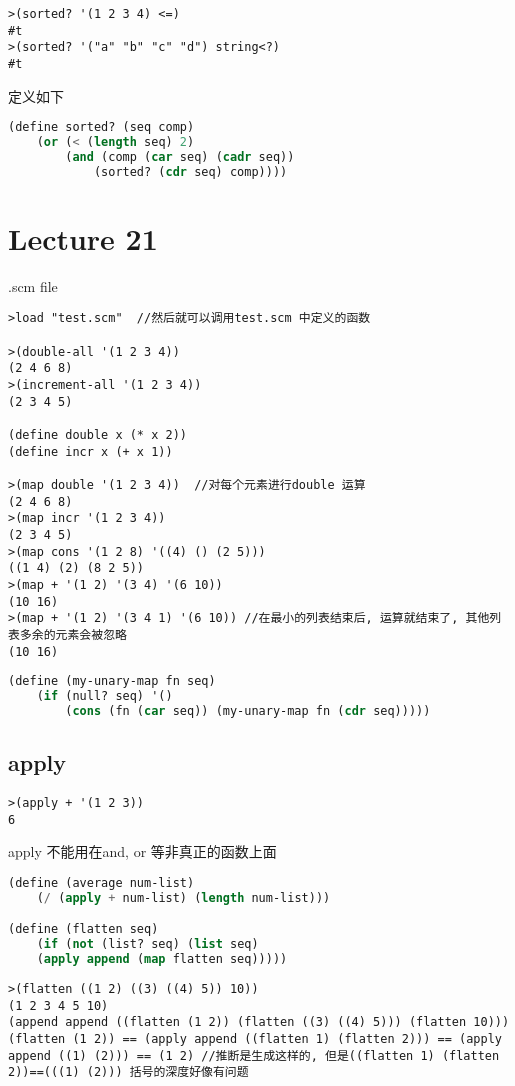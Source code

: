 \documentclass{article}
\begin{document}
\begin{verbatim}
>(sorted? '(1 2 3 4) <=)
#t
>(sorted? '("a" "b" "c" "d") string<?)
#t
\end{verbatim}
定义如下
\begin{lstlisting}[language = Lisp]
(define sorted? (seq comp)
	(or (< (length seq) 2)
		(and (comp (car seq) (cadr seq))
			(sorted? (cdr seq) comp))))
\end{lstlisting}

\section{Lecture 21}
.scm file
\begin{verbatim}
>load "test.scm"  //然后就可以调用test.scm 中定义的函数

>(double-all '(1 2 3 4))
(2 4 6 8)
>(increment-all '(1 2 3 4))
(2 3 4 5)

(define double x (* x 2))
(define incr x (+ x 1))

>(map double '(1 2 3 4))  //对每个元素进行double 运算
(2 4 6 8)
>(map incr '(1 2 3 4))
(2 3 4 5)
>(map cons '(1 2 8) '((4) () (2 5)))
((1 4) (2) (8 2 5))
>(map + '(1 2) '(3 4) '(6 10))
(10 16)
>(map + '(1 2) '(3 4 1) '(6 10)) //在最小的列表结束后, 运算就结束了, 其他列表多余的元素会被忽略
(10 16)
\end{verbatim}

\begin{lstlisting}[language = Lisp]
(define (my-unary-map fn seq)
	(if (null? seq) '()
		(cons (fn (car seq)) (my-unary-map fn (cdr seq)))))
\end{lstlisting}

\subsection{apply}
\begin{verbatim}
>(apply + '(1 2 3))
6
\end{verbatim}apply 不能用在and, or 等非真正的函数上面

\begin{lstlisting}[language = Lisp]
(define (average num-list)
	(/ (apply + num-list) (length num-list)))

(define (flatten seq)
	(if (not (list? seq) (list seq)
	(apply append (map flatten seq)))))
\end{lstlisting}

\begin{verbatim}
>(flatten ((1 2) ((3) ((4) 5)) 10))
(1 2 3 4 5 10)
(append append ((flatten (1 2)) (flatten ((3) ((4) 5))) (flatten 10)))
(flatten (1 2)) == (apply append ((flatten 1) (flatten 2))) == (apply append ((1) (2))) == (1 2) //推断是生成这样的, 但是((flatten 1) (flatten 2))==(((1) (2))) 括号的深度好像有问题
\end{verbatim}
\end{document}

